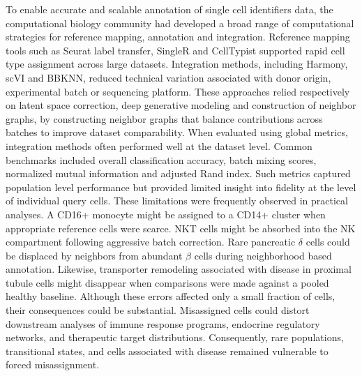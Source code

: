 \documentclass[11pt]{article}
\begin{document}
To enable accurate and scalable annotation of single cell identifiers data, the computational biology community had developed a broad range of computational strategies for reference mapping\cite{Abdelaal2019ComparisonAnnotation}, annotation\cite{Pasquini2021AnnotationReview} and integration\cite{Heumos2023BestPractices}. Reference mapping tools such as Seurat label transfer\cite{Stuart2019Seurat}, SingleR\cite{Aran2019SingleR} and CellTypist\cite{DominguezConde2022CellTypist} supported rapid cell type assignment across large datasets. Integration methods, including Harmony\cite{Korsunsky2019Harmony}, scVI\cite{Lopez2018scVI} and BBKNN\cite{Polanski2020BBKNN}, reduced technical variation associated with donor origin, experimental batch or sequencing platform\cite{Haghverdi2018BatchEffects,Luecken2022IntegrationBenchmark}. These approaches relied respectively on latent space correction, deep generative modeling and construction of neighbor graphs, by constructing neighbor graphs that balance contributions across batches to improve dataset comparability\cite{Korsunsky2019Harmony,Lopez2018scVI,Polanski2020BBKNN}. When evaluated using global metrics, integration methods often performed well at the dataset level\cite{Luecken2022IntegrationBenchmark}. Common benchmarks included overall classification accuracy, batch mixing scores, normalized mutual information\cite{Vinh2010NMI} and adjusted Rand index\cite{HubertArabie1985ARI}. Such metrics captured population level performance but provided limited insight into fidelity at the level of individual query cells\cite{Abdelaal2019ComparisonAnnotation,Luecken2022IntegrationBenchmark}. These limitations were frequently observed in practical analyses\cite{Lahnemann2020Challenges,Abdelaal2019ComparisonAnnotation,Pasquini2021AnnotationReview}. A CD16+ monocyte might be assigned to a CD14+ cluster when appropriate reference cells were scarce\cite{Villani2017Immune,Abdelaal2019ComparisonAnnotation}. NKT cells might be absorbed into the NK compartment following aggressive batch correction\cite{Vivier2011NKCells,Haghverdi2018BatchEffects,Luecken2022IntegrationBenchmark}. Rare pancreatic $\delta$ cells could be displaced by neighbors from abundant $\beta$ cells during neighborhood based annotation\cite{Muraro2016Pancreas,Baron2016Pancreas,Segerstolpe2016Pancreas,Xin2016Pancreas,Lawlor2017Pancreas}. Likewise, transporter remodeling associated with disease in proximal tubule cells might disappear when comparisons were made against a pooled healthy baseline\cite{Muto2021Kidney,Wilson2022DKD,Lake2023KidneyAtlas,Gerhardt2021PTStates}. Although these errors affected only a small fraction of cells, their consequences could be substantial\cite{Kiselev2019Challenges,Lahnemann2020Challenges}. Misassigned cells could distort downstream analyses of immune response programs, endocrine regulatory networks, and therapeutic target distributions\cite{Villani2017Immune,Segerstolpe2016Pancreas,Lake2023KidneyAtlas}. Consequently, rare populations, transitional states, and cells associated with disease remained vulnerable to forced misassignment\cite{Trapnell2015CellTypesStates,Kiselev2019Challenges,Heumos2023BestPractices}.
\end{document}
